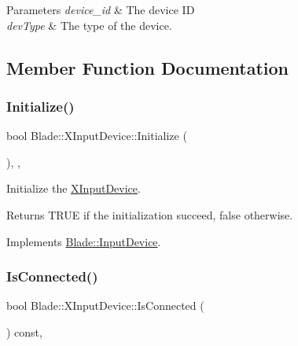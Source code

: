 \begin{DoxyParams}{Parameters}
{\em device\+\_\+id} & The device ID \\
\hline
{\em dev\+Type} & The type of the device. \\
\hline
\end{DoxyParams}


\subsection{Member Function Documentation}
\mbox{\label{class_blade_1_1_x_input_device_af446c4579260d23b0af0a7f4bdfda441}} 
\subsubsection{\texorpdfstring{Initialize()}{Initialize()}}
{\footnotesize\ttfamily bool Blade\+::\+X\+Input\+Device\+::\+Initialize (\begin{DoxyParamCaption}{ }\end{DoxyParamCaption})\hspace{0.3cm}{\ttfamily [override]}, {\ttfamily [protected]}, {\ttfamily [virtual]}}



Initialize the \hyperlink{class_blade_1_1_x_input_device}{X\+Input\+Device}. 

\begin{DoxyReturn}{Returns}
T\+R\+UE if the initialization succeed, false otherwise. 
\end{DoxyReturn}


Implements \hyperlink{class_blade_1_1_input_device_a701823a23160c1e4e169716647d6570b}{Blade\+::\+Input\+Device}.

\mbox{\label{class_blade_1_1_x_input_device_a4eb3b23fabf556140c0ab14dd44a7009}} 
\subsubsection{\texorpdfstring{Is\+Connected()}{IsConnected()}}
{\footnotesize\ttfamily bool Blade\+::\+X\+Input\+Device\+::\+Is\+Connected (\begin{DoxyParamCaption}{ }\end{DoxyParamCaption}) const\hspace{0.3cm}{\ttfamily [override]}, {\ttfamily [virtual]}}



